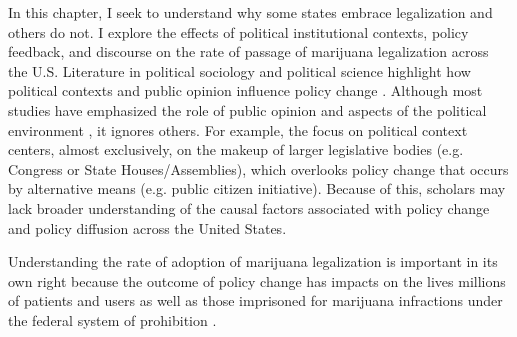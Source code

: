 In this chapter, I seek to understand why some states embrace legalization and others do not. I explore the effects of political institutional contexts, policy feedback, and discourse on the rate of passage of marijuana legalization across the U.S. Literature in political sociology and political science highlight how political contexts and public opinion influence policy change \citep{burstein_and_linton_2002,amenta_et_al_2001,amenta_and_elliott_2019}. Although most studies have emphasized the role of public opinion and aspects of the political environment  \citep{burstein_and_linton_2002}, it ignores others. For example, the focus on political context centers, almost exclusively, on the makeup of larger legislative bodies (e.g. Congress or State Houses/Assemblies), which overlooks policy change that occurs by alternative means (e.g. public citizen initiative). Because of this, scholars may lack broader understanding of the causal factors associated with policy change and policy diffusion across the United States. 

Understanding the rate of adoption of marijuana legalization is important in its own right because the outcome of policy change has impacts on the lives millions of patients and users \citep{newhart_and_dolphin_2018,miron_2010,mosher_and_akins_2019} as well as those imprisoned for marijuana infractions under the federal system of prohibition \citep{sered_2019,gottschalk_2016,alexander_2010}. 


